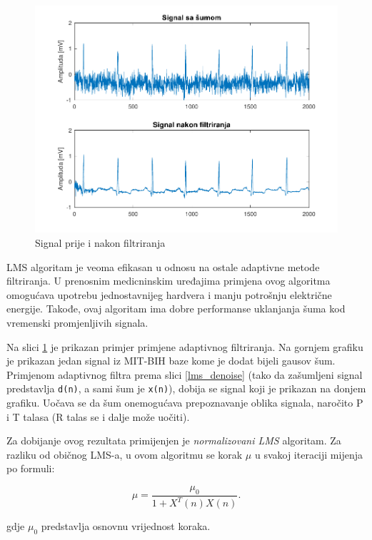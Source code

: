 \documentclass[12pt]{SeminarskiADS}
\begin{document}
\begin{figure}[h]
\centering
\includegraphics[width=\textwidth]{lmsgrafik}
\caption{Signal prije i nakon filtriranja}
\label{lmsgrafik}
\end{figure}

LMS algoritam je veoma efikasan u odnosu na ostale adaptivne metode filtriranja. U prenosnim medicninskim uređajima primjena ovog algoritma omogućava upotrebu jednostavnijeg hardvera i manju potrošnju električne energije. Takođe, ovaj algoritam ima dobre performanse uklanjanja šuma kod vremenski promjenljivih signala. 

Na slici \ref{lmsgrafik} je prikazan primjer primjene adaptivnog filtriranja. Na gornjem grafiku je prikazan jedan signal iz MIT-BIH baze kome je dodat bijeli gausov šum. Primjenom adaptivnog filtra prema slici \ref{lms_denoise} (tako da zašumljeni signal predstavlja \verb|d(n)|, a sami šum je \verb|x(n)|), dobija se signal koji je prikazan na donjem grafiku. Uočava se da šum onemogućava prepoznavanje oblika signala, naročito P i T talasa (R talas se i dalje može uočiti).

Za dobijanje ovog rezultata primijenjen je \emph{normalizovani LMS} algoritam. Za razliku od običnog LMS-a, u ovom algoritmu se korak $\mu$ u svakoj iteraciji mijenja po formuli:

\begin{equation}
\label{eq:nlms}
\mu=\frac{\mu_{0}}{1+X^T(n)X(n)}.
\end{equation}  

gdje $\mu_{0}$ predstavlja osnovnu vrijednost koraka.
\end{document}
